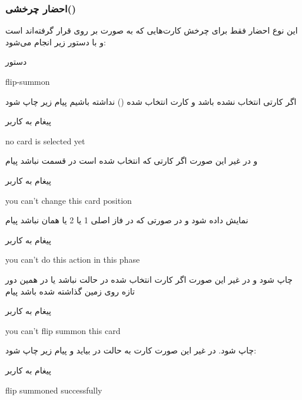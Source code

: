 \documentclass[]{article}
\begin{document}
\subsubsection*{{\titr احضار چرخشی()}}
این نوع احضار فقط برای چرخش کارت‌هایی که به صورت  بر روی
  قرار گرفته‌اند است و با دستور زیر انجام می‌شود:
\begin{mybox}[colback=yellow]{دستور}
	\begin{latin}	
	    flip-summon	
	\end{latin}
\end{mybox}
    اگر کارتی انتخاب نشده باشد و کارت انتخاب شده () نداشته 
    باشیم پیام زیر چاپ شود
\begin{mybox}[colback=yellow]{پیغام به کاربر}
	\begin{latin}	
		no card is selected yet
	\end{latin}
\end{mybox}
و در غیر این صورت اگر کارتی که انتخاب شده است  در قسمت  
نباشد پیام
\begin{mybox}[colback=yellow]{پیغام به کاربر}
	\begin{latin}	
		you can’t change this card position	
	\end{latin}
\end{mybox}
نمایش داده شود و در صورتی که در فاز اصلی 1 یا 2 یا همان  
نباشد پیام
\begin{mybox}[colback=yellow]{پیغام به کاربر}
	\begin{latin}	
		you can’t do this action in this phase	
	\end{latin}
\end{mybox}
چاپ شود و در غیر این صورت اگر کارت انتخاب شده در حالت  نباشد یا در 
همین دور تازه روی زمین گذاشته شده باشد پیام
\begin{mybox}[colback=yellow]{پیغام به کاربر}
	\begin{latin}	
	    you can’t flip summon this card
	\end{latin}
\end{mybox}
    چاپ شود. در غیر این صورت کارت به حالت  در بیاید و پیام زیر چاپ 
    شود:
\begin{mybox}[colback=yellow]{پیغام به کاربر}
	\begin{latin}	
	    flip summoned successfully		
	\end{latin}
\end{mybox}
\end{document}
